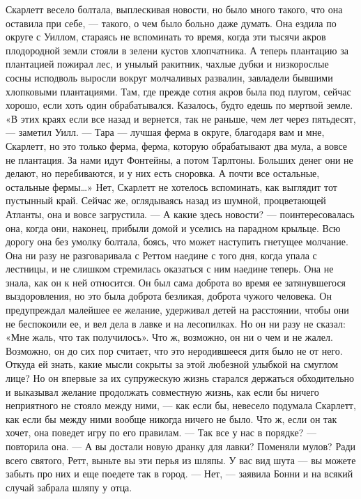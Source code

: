 Скарлетт весело болтала, выплескивая новости, но было много такого, что она оставила при себе, — такого, о чем было больно даже думать. Она ездила по округе с Уиллом, стараясь не вспоминать то время, когда эти тысячи акров плодородной земли стояли в зелени кустов хлопчатника. А теперь плантацию за плантацией пожирал лес, и унылый ракитник, чахлые дубки и низкорослые сосны исподволь выросли вокруг молчаливых развалин, завладели бывшими хлопковыми плантациями. Там, где прежде сотня акров была под плугом, сейчас хорошо, если хоть один обрабатывался. Казалось, будто едешь по мертвой земле.
«В этих краях если все назад и вернется, так не раньше, чем лет через пятьдесят, — заметил Уилл. — Тара — лучшая ферма в округе, благодаря вам и мне, Скарлетт, но это только ферма, ферма, которую обрабатывают два мула, а вовсе не плантация. За нами идут Фонтейны, а потом Тарлтоны. Больших денег они не делают, но перебиваются, и у них есть сноровка. А почти все остальные, остальные фермы…» Нет, Скарлетт не хотелось вспоминать, как выглядит тот пустынный край. Сейчас же, оглядываясь назад из шумной, процветающей Атланты, она и вовсе загрустила.
— А какие здесь новости? — поинтересовалась она, когда они, наконец, прибыли домой и уселись на парадном крыльце. Всю дорогу она без умолку болтала, боясь, что может наступить гнетущее молчание. Она ни разу не разговаривала с Реттом наедине с того дня, когда упала с лестницы, и не слишком стремилась оказаться с ним наедине теперь. Она не знала, как он к ней относится. Он был сама доброта во время ее затянувшегося выздоровления, но это была доброта безликая, доброта чужого человека. Он предупреждал малейшее ее желание, удерживал детей на расстоянии, чтобы они не беспокоили ее, и вел дела в лавке и на лесопилках. Но он ни разу не сказал: «Мне жаль, что так получилось». Что ж, возможно, он ни о чем и не жалел. Возможно, он до сих пор считает, что это неродившееся дитя было не от него. Откуда ей знать, какие мысли сокрыты за этой любезной улыбкой на смуглом лице? Но он впервые за их супружескую жизнь старался держаться обходительно и выказывал желание продолжать совместную жизнь, как если бы ничего неприятного не стояло между ними, — как если бы, невесело подумала Скарлетт, как если бы между ними вообще никогда ничего не было. Что ж, если он так хочет, она поведет игру по его правилам.
— Так все у нас в порядке? — повторила она. — А вы достали новую дранку для лавки? Поменяли мулов? Ради всего святого, Ретт, выньте вы эти перья из шляпы. У вас вид шута — вы можете забыть про них и еще поедете так в город.
— Нет, — заявила Бонни и на всякий случай забрала шляпу у отца.
